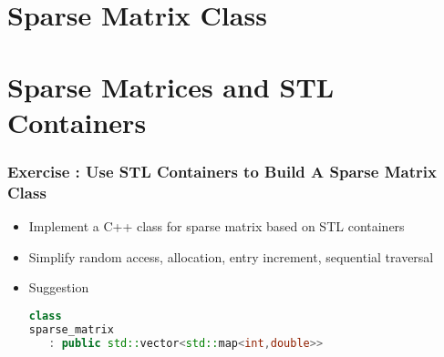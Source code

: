 \documentclass{beamer}
\begin{document}
\section{Sparse Matrix Class}

\section{Sparse Matrices and STL Containers}
\begin{frame}[fragile]
\frametitle{Exercise : Use STL Containers to Build A Sparse Matrix Class}
\begin{itemize}
\item Implement a C++ class for sparse matrix based on STL containers
\item Simplify random access, allocation, entry increment, sequential traversal
\item Suggestion \small
\begin{lstlisting}[language=C++]
class 
sparse_matrix 
   : public std::vector<std::map<int,double>>
\end{lstlisting}\normalsize
\end{itemize}
\end{frame}
\end{document}
